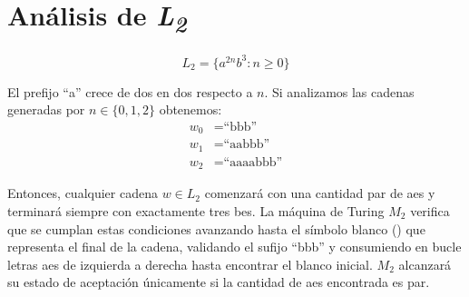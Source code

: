 \documentclass[../main.tex]{subfiles}
\begin{document}
    \section{Análisis de \texorpdfstring{\emph{L\textsubscript{2}}}{L2}}
    \[
        \boxed{L_2=\{a^{2n}b^3:n\ge0\}}
    \]

    El prefijo ``a'' crece de dos en dos respecto a \(n\). Si analizamos las cadenas generadas por \(n\in\{0,1,2\}\) obtenemos:
    \begin{align*}
        w_0 &= \text{``bbb''}\\
        w_1 &=\text{``aabbb''}\\
        w_2 &=\text{``aaaabbb''}
    \end{align*}

    Entonces, cualquier cadena \(w \in L_2\) comenzará con una cantidad par de aes y terminará siempre con exactamente tres bes. La máquina de Turing \(M_2\) verifica que se cumplan estas condiciones avanzando hasta el símbolo blanco (\textcrb) que representa el final de la cadena, validando el sufijo ``bbb'' y consumiendo en bucle letras aes de izquierda a derecha hasta encontrar el blanco inicial. \(M_2\) alcanzará su estado de aceptación únicamente si la cantidad de aes encontrada es par.
\end{document}
